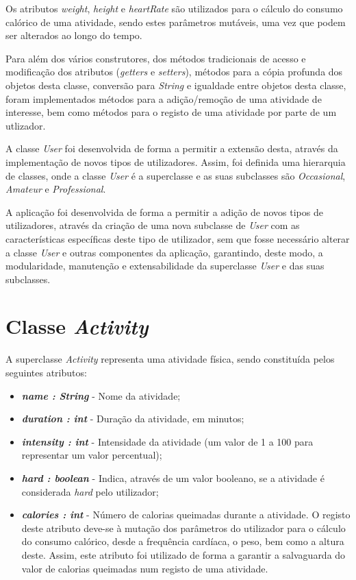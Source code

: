 \documentclass[a4paper,12pt]{scrreprt}
\begin{document}
    Os atributos \textit{weight}, \textit{height} e \textit{heartRate} são utilizados para o cálculo do consumo calórico de uma atividade,
    sendo estes parâmetros mutáveis, uma vez que podem ser alterados ao longo do tempo.

    Para além dos vários construtores, dos métodos tradicionais de acesso e modificação dos atributos (\textit{getters} e \textit{setters}), métodos para a cópia profunda dos objetos desta classe, conversão para \textit{String} e igualdade entre objetos desta classe, foram implementados métodos para a adição/remoção de uma atividade de interesse, bem como métodos para o registo de uma atividade por parte de um utlizador.

    A classe \textit{User} foi desenvolvida de forma a permitir a extensão desta, através da implementação de novos tipos de utilizadores.
    Assim, foi definida uma hierarquia de classes, onde a classe \textit{User} é a superclasse e as suas subclasses são \textit{Occasional}, \textit{Amateur} e \textit{Professional}.

    A aplicação foi desenvolvida de forma a permitir a adição de novos tipos de utilizadores,
    através da criação de uma nova subclasse de \textit{User} com as características específicas deste tipo de utilizador,
    sem que fosse necessário alterar a classe \textit{User} e outras componentes da aplicação,
    garantindo, deste modo, a modularidade, manutenção e extensabilidade da superclasse \textit{User} e das suas subclasses.

\section{Classe \textit{Activity}}
    A superclasse \textit{Activity} representa uma atividade física, sendo constituída pelos seguintes atributos:

    \begin{itemize}
        \item \textit{\textbf{name : String}} - Nome da atividade;
        \item \textit{\textbf{duration : int}} - Duração da atividade, em minutos;
        \item \textit{\textbf{intensity : int}} - Intensidade da atividade (um valor de 1 a 100 para representar um valor percentual);
        \item \textit{\textbf{hard : boolean}} - Indica, através de um valor booleano, se a atividade é considerada \textit{hard} pelo utilizador;
        \item \textit{\textbf{calories : int}} - Número de calorias queimadas durante a atividade. O registo deste atributo deve-se à mutação dos parâmetros do utilizador para o cálculo do consumo calórico, desde a frequência cardíaca, o peso, bem como a altura deste. Assim, este atributo foi utilizado de forma a garantir a salvaguarda do valor de calorias queimadas num registo de uma atividade.
    \end{itemize}
\end{document}
